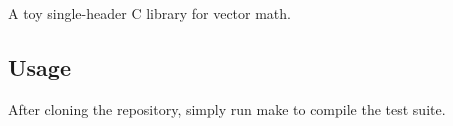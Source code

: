 A toy single-\/header C library for vector math.

\subsection*{Usage}

After cloning the repository, simply run {\ttfamily make} to compile the test suite. 